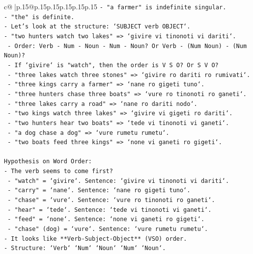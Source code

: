 \documentclass{article}
\begin{document}
{\begin{supertabular}{c@{$\;$}|p{.15\linewidth}@{}p{.15\linewidth}p{.15\linewidth}p{.15\linewidth}p{.15\linewidth}p{.15\linewidth}}
{{{\texttt{{-} "a farmer" is indefinite singular.} \\
\texttt{{-} "the" is definite.} \\
\texttt{{-} Let's look at the structure: `SUBJECT verb OBJECT`.} \\
\texttt{{-} "two hunters watch two lakes" => `givire vi tinonoti vi dariti`.} \\
\texttt{  {-} Order: Verb {-} Num {-} Noun {-} Num {-} Noun? Or Verb {-} (Num Noun) {-} (Num Noun)?} \\
\texttt{  {-} If `givire` is "watch", then the order is V S O? Or S V O?} \\
\texttt{  {-} "three lakes watch three stones" => `givire ro dariti ro rumivati`.} \\
\texttt{  {-} "three kings carry a farmer" => `nane ro gigeti tuno`.} \\
\texttt{  {-} "three hunters chase three boats" => `vure ro tinonoti ro ganeti`.} \\
\texttt{  {-} "three lakes carry a road" => `nane ro dariti nodo`.} \\
\texttt{  {-} "two kings watch three lakes" => `givire vi gigeti ro dariti`.} \\
\texttt{  {-} "two hunters hear two boats" => `tede vi tinonoti vi ganeti`.} \\
\texttt{  {-} "a dog chase a dog" => `vure rumetu rumetu`.} \\
\texttt{  {-} "two boats feed three kings" => `none vi ganeti ro gigeti`.} \\
\\ 
\texttt{Hypothesis on Word Order:} \\
\texttt{{-} The verb seems to come first?} \\
\texttt{  {-} "watch" = `givire`. Sentence: `givire vi tinonoti vi dariti`.} \\
\texttt{  {-} "carry" = `nane`. Sentence: `nane ro gigeti tuno`.} \\
\texttt{  {-} "chase" = `vure`. Sentence: `vure ro tinonoti ro ganeti`.} \\
\texttt{  {-} "hear" = `tede`. Sentence: `tede vi tinonoti vi ganeti`.} \\
\texttt{  {-} "feed" = `none`. Sentence: `none vi ganeti ro gigeti`.} \\
\texttt{  {-} "chase" (dog) = `vure`. Sentence: `vure rumetu rumetu`.} \\
\texttt{{-} It looks like **Verb{-}Subject{-}Object** (VSO) order.} \\
\texttt{{-} Structure: `Verb` `Num` `Noun` `Num` `Noun`.} \\
}}}
\end{supertabular}}
\end{document}
